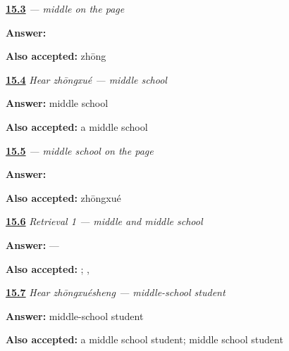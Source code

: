 \noindent\begin{minipage}[t]{\linewidth}
\raggedright
\hyperlink{review-ZH-C15-zhong-write}{\textbf{15.3}} \emph{ — middle on the page}\par
\small \textbf{Answer:} \par
\footnotesize \textbf{Also accepted:}  zhōng
\end{minipage}\par\medskip

\noindent\begin{minipage}[t]{\linewidth}
\raggedright
\hyperlink{review-ZH-C15-hear-zhongxue-meaning}{\textbf{15.4}} \emph{Hear \emph{zhōngxué} — middle school}\par
\small \textbf{Answer:} middle school\par
\footnotesize \textbf{Also accepted:} a middle school
\end{minipage}\par\medskip

\noindent\begin{minipage}[t]{\linewidth}
\raggedright
\hyperlink{review-ZH-C15-zhongxue-write}{\textbf{15.5}} \emph{ — middle school on the page}\par
\small \textbf{Answer:} \par
\footnotesize \textbf{Also accepted:}  zhōngxué
\end{minipage}\par\medskip

\noindent\begin{minipage}[t]{\linewidth}
\raggedright
\hyperlink{review-ZH-R15-school-map-1-recall}{\textbf{15.6}} \emph{Retrieval 1 — middle and middle school}\par
\small \textbf{Answer:}  — \par
\footnotesize \textbf{Also accepted:}  ; , 
\end{minipage}\par\medskip

\noindent\begin{minipage}[t]{\linewidth}
\raggedright
\hyperlink{review-ZH-C15-hear-zhongxuesheng-meaning}{\textbf{15.7}} \emph{Hear \emph{zhōngxuésheng} — middle-school student}\par
\small \textbf{Answer:} middle-school student\par
\footnotesize \textbf{Also accepted:} a middle school student; middle school student
\end{minipage}\par\medskip

